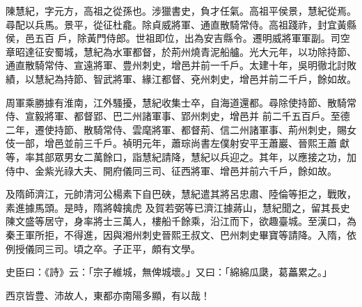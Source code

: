 \begin{pinyinscope}
 陳慧紀，字元方，高祖之從孫也。涉獵書史，負才任氣。高祖平侯景，慧紀從焉。尋配以兵馬。景平，從征杜龕。除貞威將軍、通直散騎常侍。高祖踐祚，封宜黃縣侯，邑五百
 戶，除黃門侍郎。世祖即位，出為安吉縣令。遷明威將軍軍副。司空章昭達征安蜀城，慧紀為水軍都督，於荊州燒青泥船艫。光大元年，以功除持節、通直散騎常侍、宣遠將軍、豊州刺史，增邑并前一千戶。太建十年，吳明徹北討敗績，以慧紀為持節、智武將軍、緣江都督、兗州刺史，增邑并前二千戶，餘如故。



 周軍乘勝據有淮南，江外騷擾，慧紀收集士卒，自海道還都。尋除使持節、散騎常侍、宣毅將軍、都督郢、巴二州諸軍事、郢州刺史，增邑并
 前二千五百戶。至德二年，遷使持節、散騎常侍、雲麾將軍、都督荊、信二州諸軍事、荊州刺史，賜女伎一部，增邑並前三千戶。禎明元年，蕭琮尚書左僕射安平王蕭巖、晉熙王蕭獻等，率其部眾男女二萬餘口，詣慧紀請降，慧紀以兵迎之。其年，以應接之功，加侍中、金紫光祿大夫、開府儀同三司、征西將軍、增邑并前六千戶，餘如故。



 及隋師濟江，元帥清河公楊素下自巴硤，慧紀遣其將呂忠肅、陸倫等拒之，戰敗，素進據馬頭。是時，隋將韓擒虎
 及賀若弼等已濟江據蔣山，慧紀聞之，留其長史陳文盛等居守，身率將士三萬人，樓船千餘乘，沿江而下，欲趣臺城。至漢口，為秦王軍所拒，不得進，因與湘州刺史晉熙王叔文、巴州刺史畢寶等請降。入隋，依例授儀同三司。頃之卒。子正平，頗有文學。



 史臣曰：《詩》云：「宗子維城，無俾城壞。」又曰：「綿綿瓜瓞，葛藟累之。」



 西京皆豊、沛故人，東都亦南陽多顯，有以哉！



\end{pinyinscope}